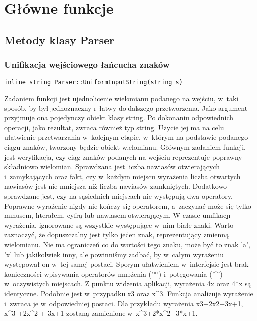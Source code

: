\section{Główne funkcje}

\subsection{Metody klasy Parser}

\subsubsection{Unifikacja wejściowego łańcucha znaków}
\begin{lstlisting}
inline string Parser::UniformInputString(string s)
\end{lstlisting}

Zadaniem funkcji jest ujednolicenie wielomianu podanego na wejściu, w~taki sposób, by był jednoznaczny i~łatwy do dalszego przetworzenia. Jako argument przyjmuje ona pojedynczy obiekt klasy string. Po dokonaniu odpowiednich operacji, jako rezultat, zwraca również typ string. Użycie jej ma na celu ułatwienie przetwarzania w~kolejnym etapie, w~którym na podstawie podanego ciągu znaków, tworzony będzie obiekt wielomianu. Głównym zadaniem funkcji, jest weryfikacja, czy ciąg znaków podanych na wejściu reprezentuje poprawny składniowo wielomian. Sprawdzana jest liczba nawiasów otwierających i~zamykających oraz fakt, czy w~każdym miejscu wyrażenia liczba otwartych nawiasów jest nie mniejsza niż liczba nawiasów zamkniętych. Dodatkowo sprawdzane jest, czy na sąsiednich miejscach nie występują dwa operatory. Poprawne wyrażenie nigdy nie kończy się operatorem, a~zaczynać może się tylko minusem, literałem, cyfrą lub nawiasem otwierającym. W czasie unifikacji wyrażenia, ignorowane są wszystkie występujące w~nim białe znaki. Warto zaznaczyć, że dopuszczalny jest tylko jeden znak, reprezentujący zmienną wielomianu. Nie ma ograniczeń co do wartości tego znaku, może być to znak 'a', 'x' lub jakikolwiek inny, ale powinniśmy zadbać, by w~całym wyrażeniu występował on w~tej samej postaci. Sporym ułatwieniem w~interfejsie jest brak konieczności wpisywania operatorów mnożenia ('*') i~potęgowania ('\^{}') w~oczywistych miejscach. Z punktu widzenia aplikacji, wyrażenia 4x oraz 4*x są identyczne. Podobnie jest w~przypadku x3 oraz x\^{}3. Funkcja analizuje wyrażenie i~zwraca je w~odpowiedniej postaci. Dla przykładu wyrażenia x3+2x2+3x+1, x\^{}3 +2x\^{}2 + 3x+1 zostaną zamienione w~x\^{}3+2*x\^{}2+3*x+1.

